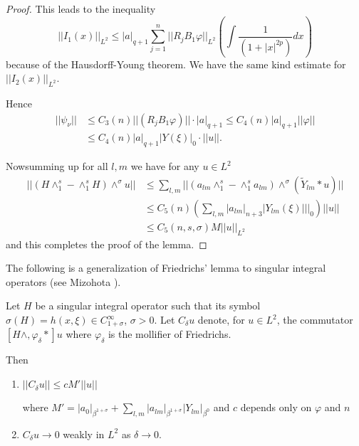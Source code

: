 \begin{proof}
This leads to the inequality 
$$
||I_1 (x)||_{L^2} \leq |a|_{q+1} \sum^n_{j=1} ||R_j B_1 \varphi
||_{L^2} \left(\int \frac{1}{(1+ |x|^{2p})}dx\right) 
$$
because of the Hausdorff-Young theorem. We have the same kind
estimate for $|| I_2 (x) ||_{L^2}$. 

Hence
\begin{align*}
||\psi_\nu || & \leq C_3 (n)|| (R_j B_1 \varphi)|| \cdot |a|_{q+1} \leq C_4
(n) |a|_{q+1} ||\varphi ||\\ 
& \leq C_4 (n) |a|_{q+1} |Y (\xi)|_0 \cdot  || u||. 
\end{align*}

Now\pageoriginale summing up for all $l, m$ we have for any 
$u \in L^2$ 
\begin{align*}
|| (H \wedge^s_1 - \wedge^s_1 H) \wedge^\sigma u|| & \leq \sum_{l,m}
|| (a_{lm} \wedge^s_1- \wedge^s_1 a_{lm}) \wedge^\sigma (\tilde{Y}_{lm} *
u)||\\ 
& \leq C_5 (n) \left(\sum_{l,m} |a_{lm}|_{n+3}| Y_{lm} (\xi )
|| |_0\right) ||u||\\  
& \leq C_5 (n, s, \sigma ) M ||u ||_{L^2}
\end{align*}
and this completes the proof of the lemma.
\end{proof}

The following is a generalization of Friedrichs' lemma to singular
integral operators (see Mizohota \cite{key1}). 

\begin{proposition}\label{chap3-sec5-prop3}%
Let $H$ be a singular integral operator such that its symbol $\sigma
(H) = h(x, \xi) \in C^\infty_{1+ \sigma}$, $ \sigma > 0$. Let
$C_\delta u$ denote, for $u \in L^2$, the commutator $[H
  \wedge, \varphi_\delta * ]u $ where $\varphi_\delta$ is the
mollifier of Friedrichs. 

Then
\begin{enumerate}
\renewcommand{\labelenumi}{\rm(\theenumi)}
\item  $|| C_\delta u|| \leq c M' ||u||$

\noindent
where $M'= |a_0 |_{\beta^{1+ \sigma}} + \sum\limits_{l,m}
|a_{lm}|_{\beta^{1+ \sigma}} | Y_{lm}|_{\beta^0}$ and $c$ depends only
on $\varphi$ and $n$ 

\item\quad $C_\delta u \rightarrow 0$ weakly in $L^2$ as $\delta
  \rightarrow 0$. 
\end{enumerate}
\end{proposition}


